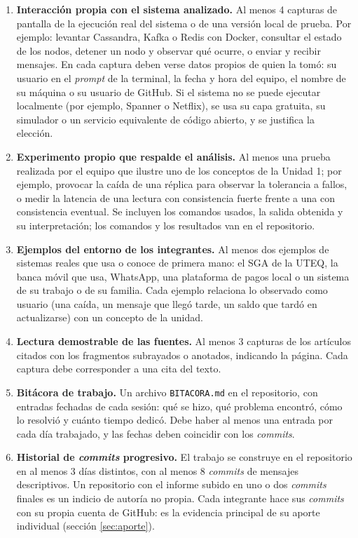 \documentclass[11pt,a4paper]{article}
\begin{document}
\begin{enumerate}[label=\textbf{E\arabic*.},leftmargin=2.2em]
	\item \textbf{Interacción propia con el sistema analizado.} Al menos 4 capturas de pantalla de la ejecución real del sistema o de una versión local de prueba. Por ejemplo: levantar Cassandra, Kafka o Redis con Docker, consultar el estado de los nodos, detener un nodo y observar qué ocurre, o enviar y recibir mensajes. En cada captura deben verse datos propios de quien la tomó: su usuario en el \emph{prompt} de la terminal, la fecha y hora del equipo, el nombre de su máquina o su usuario de GitHub. Si el sistema no se puede ejecutar localmente (por ejemplo, Spanner o Netflix), se usa su capa gratuita, su simulador o un servicio equivalente de código abierto, y se justifica la elección.
	\item \textbf{Experimento propio que respalde el análisis.} Al menos una prueba realizada por el equipo que ilustre uno de los conceptos de la Unidad 1; por ejemplo, provocar la caída de una réplica para observar la tolerancia a fallos, o medir la latencia de una lectura con consistencia fuerte frente a una con consistencia eventual. Se incluyen los comandos usados, la salida obtenida y su interpretación; los comandos y los resultados van en el repositorio.
	\item \textbf{Ejemplos del entorno de los integrantes.} Al menos dos ejemplos de sistemas reales que usa o conoce de primera mano: el SGA de la UTEQ, la banca móvil que usa, WhatsApp, una plataforma de pagos local o un sistema de su trabajo o de su familia. Cada ejemplo relaciona lo observado como usuario (una caída, un mensaje que llegó tarde, un saldo que tardó en actualizarse) con un concepto de la unidad.
	\item \textbf{Lectura demostrable de las fuentes.} Al menos 3 capturas de los artículos citados con los fragmentos subrayados o anotados, indicando la página. Cada captura debe corresponder a una cita del texto.
	\item \textbf{Bitácora de trabajo.} Un archivo \texttt{BITACORA.md} en el repositorio, con entradas fechadas de cada sesión: qué se hizo, qué problema encontró, cómo lo resolvió y cuánto tiempo dedicó. Debe haber al menos una entrada por cada día trabajado, y las fechas deben coincidir con los \emph{commits}.
	\item \textbf{Historial de \emph{commits} progresivo.} El trabajo se construye en el repositorio en al menos 3 días distintos, con al menos 8 \emph{commits} de mensajes descriptivos. Un repositorio con el informe subido en uno o dos \emph{commits} finales es un indicio de autoría no propia. Cada integrante hace sus \emph{commits} con su propia cuenta de GitHub: es la evidencia principal de su aporte individual (sección \ref{sec:aporte}).

\end{enumerate}
\end{document}
